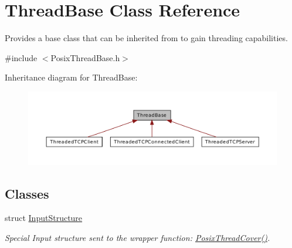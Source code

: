 \hypertarget{class_thread_base}{\section{Thread\-Base Class Reference}
\label{class_thread_base}
}


Provides a base class that can be inherited from to gain threading capabilities.  




{\ttfamily \#include $<$Posix\-Thread\-Base.\-h$>$}



Inheritance diagram for Thread\-Base\-:\nopagebreak
\begin{figure}[H]
\begin{center}
\leavevmode
\includegraphics[width=350pt]{class_thread_base__inherit__graph}
\end{center}
\end{figure}
\subsection*{Classes}
\begin{DoxyCompactItemize}
\item 
struct \hyperlink{struct_thread_base_1_1_input_structure}{Input\-Structure}
\begin{DoxyCompactList}\small\item\em Special Input structure sent to the wrapper function\-: \hyperlink{class_thread_base_a2567acd55e8bbdbf8ac90a8f77bb4943}{Posix\-Thread\-Cover()}. \end{DoxyCompactList}\end{DoxyCompactItemize}
